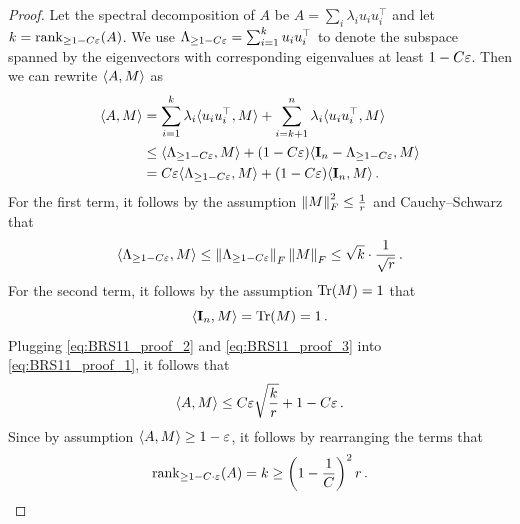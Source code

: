 \begin{proof}
    Let the spectral decomposition of $A$ be $A = \sum_{i} \lambda_i u_i u_i^{\top}$ and let $k = \operatorname{rank}_{\geq 1- C \varepsilon} (A)$.
    We use $\Lambda_{\geq 1- C\varepsilon} = \sum_{i=1}^{k} u_i u_i^{\top}$ to denote the subspace spanned by the eigenvectors with corresponding eigenvalues at least $1- C\varepsilon$. 
    Then we can rewrite $\langle A, M\rangle$ as
    \begin{align}
    \label{eq:BRS11_proof_1}
    \begin{split}
        \iprod{A, M}
        & = \sum_{i=1}^{k} \lambda_i \iprod{u_i u_i^{\top}, M} + \sum_{i=k+1}^{n} \lambda_i \iprod{u_i u_i^{\top}, M} \\
        & \leq \iprod{\Lambda_{\geq 1- C\e}, M} + (1- C\e) \iprod{\Id_n - \Lambda_{\geq 1- C\e}, M} \\
        & =  C \e \iprod{\Lambda_{\geq 1- C\e}, M} + (1- C\e) \iprod{\Id_n, M} \,.
    \end{split}
    \end{align}
    For the first term, it follows by the assumption $\left\lVert M\right\rVert_F^2 \leq \frac{1}{r}$ and Cauchy–Schwarz that
    \begin{equation}
    \label{eq:BRS11_proof_2}
        \iprod{\Lambda_{\geq 1- C\e}, M}
        \leq \Norm{\Lambda_{\geq 1- C\e}}_F \Norm{M}_F
        \leq  \sqrt{k} \cdot \frac{1}{\sqrt{r}}\,.
    \end{equation}
    For the second term, it follows by the assumption $\mathrm{Tr}(M) = 1$ that
    \begin{equation}
    \label{eq:BRS11_proof_3}
        \iprod{\Id_n, M} = \Tr(M) = 1 \,.
    \end{equation}
    Plugging \cref{eq:BRS11_proof_2} and \cref{eq:BRS11_proof_3} into \cref{eq:BRS11_proof_1}, it follows that
    \begin{equation*}
        \langle A, M\rangle
        \leq C \varepsilon \sqrt{\frac{k}{r}} + 1- C\varepsilon \,.
    \end{equation*}
    Since by assumption $\langle A, M\rangle \geq 1-\varepsilon$, it follows by rearranging the terms that
    \begin{equation*}
        \operatorname{rank}_{\geq 1- C \cdot \varepsilon} (A)
        = k
        \geq \left(1-\frac{1}{C}\right)^2 r \,.
    \end{equation*}
\end{proof}
